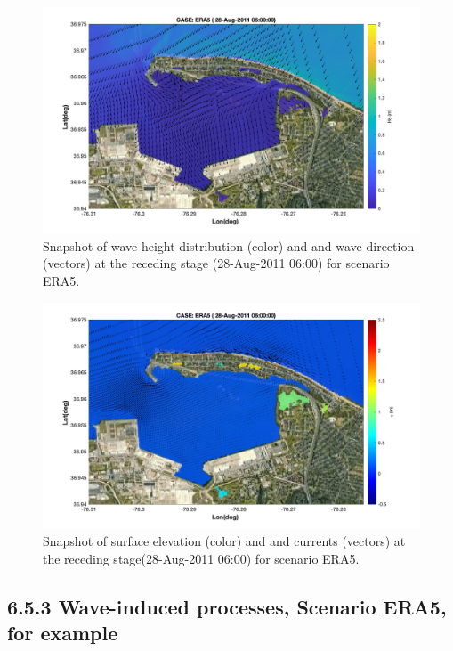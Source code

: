 \documentclass[11pt]{article}
\begin{document}
\begin{figure}[h!]
\centering
\includegraphics[width=\textwidth]{./figures/nearcom_hs_ERA5_133.jpg}
\caption{Snapshot of wave height distribution (color) and and wave direction (vectors) at the receding stage (28-Aug-2011 06:00) for scenario ERA5. }
\label{ERA5_hs_3}
\centering
\end{figure}

\begin{figure}[h!]
\centering
\includegraphics[width=\textwidth]{./figures/nearcom_ele_ERA5_133.jpg}
\caption{Snapshot of surface elevation (color) and and currents (vectors)  at the receding stage(28-Aug-2011 06:00) for scenario ERA5. }
\label{ERA5_eta_3}
\centering
\end{figure}

\subsection*{6.5.3 Wave-induced processes, Scenario ERA5, for example}
\end{document}
